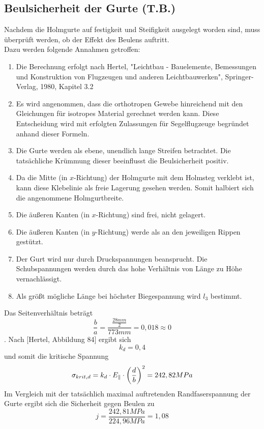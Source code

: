 \subsection{Beulsicherheit der Gurte (T.B.)}
Nachdem die Holmgurte auf festigkeit und Steifigkeit ausgelegt worden sind, muss überprüft werden, ob der Effekt des Beulens auftritt.\\

\noindent Dazu werden folgende Annahmen getroffen:

\begin{enumerate}
	\item Die Berechnung erfolgt nach Hertel, "Leichtbau - Bauelemente, Bemessungen und Konstruktion von Flugzeugen und anderen Leichtbauwerken", Springer-Verlag, 1980, Kapitel 3.2
	\item Es wird angenommen, dass die orthotropen Gewebe hinreichend mit den Gleichungen für isotropes Material gerechnet werden kann. Diese Entscheidung wird mit erfolgten Zulassungen für Segelflugzeuge begründet anhand dieser Formeln.
	\item Die Gurte werden als ebene, unendlich lange Streifen betrachtet. Die tatsächliche Krümmung dieser beeinflusst die Beulsicherheit positiv.
	\item Da die Mitte (in $x$-Richtung) der Holmgurte mit dem Holmsteg verklebt ist, kann diese Klebelinie als freie Lagerung gesehen werden. Somit halbiert sich die angenommene Holmgurtbreite.
	\item Die äußeren Kanten (in $x$-Richtung) sind frei, nicht gelagert.
	\item Die äußeren Kanten (in $y$-Richtung) werde als an den jeweiligen Rippen gestützt.
	\item Der Gurt wird nur durch Druckspannungen beansprucht. Die Schubspannungen werden durch das hohe Verhältnis von Länge zu  Höhe vernachlässigt.
	\item Als größt mögliche Länge bei höchster Biegespannung wird $l_{3}$ bestimmt.
\end{enumerate}
Das Seitenverhältnis beträgt 
\begin{equation}
	\frac{b}{a}=\frac{\frac{28 mm}{2}}{773 mm}=0,018 \approx 0
\end{equation}
. Nach [Hertel, Abbildung 84] ergibt sich
\begin{equation}
	k_{d}=0,4
\end{equation}
und somit die kritische Spannung
\begin{equation}
	\sigma_{krit,d}=k_{d}\cdot E_{\parallel}\cdot\biggl(\frac{d}{b}\biggr)^{2}\\
	= 242,82 MPa
\end{equation}
Im Vergleich mit der tatsächlich maximal auftretenden Randfaserspannung der Gurte ergibt sich die Sicherheit gegen Beulen zu 
\begin{equation}
	j=\frac{242,81 MPa}{224,96 MPa}=1,08
\end{equation}



